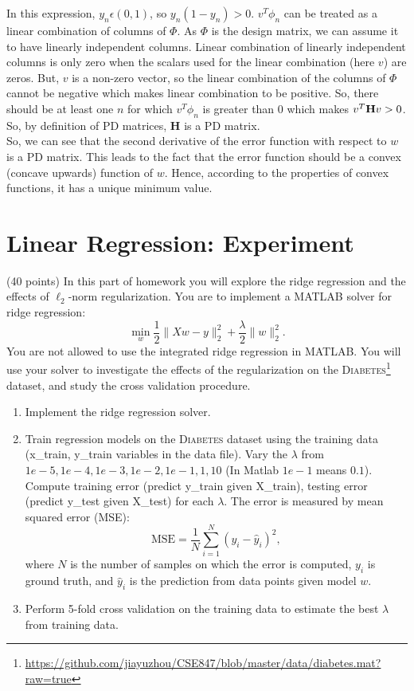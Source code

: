 \documentclass[11pt]{article}
\begin{document}
\begin{enumerate}
In this expression, $y_n \epsilon (0,1)$, so $y_n (1 - y_n) > 0$. $v^T \phi_n$ can be treated as a linear combination of columns of $\Phi$. As $\Phi$ is the design matrix, we can assume it to have linearly independent columns. Linear combination of linearly independent columns is only zero when the scalars used for the linear combination (here $v$) are zeros. But, $v$ is a non-zero vector, so the linear combination of the columns of $\Phi$ cannot be negative which makes linear combination to be positive. So, there should be at least one $n$ for which $v^T \phi_n$ is greater than $0$ which makes $v^T \bold{H} v > 0$. So, by definition of PD matrices, $\textbf{H}$ is a PD matrix.\\ 

So, we can see that the second derivative of the error function with respect to $w$ is a PD matrix. This leads to the fact that the error function should be a convex (concave upwards) function of $w$.  Hence, according to the properties of convex functions, it has a unique minimum value.
\end{enumerate}

\section{Linear Regression: Experiment} 

 (40 points) In this part of homework you will explore the ridge regression and the effects of
$\ell_2$-norm regularization. You are to implement a MATLAB solver for ridge regression:
$$ \min_w \frac{1}{2}\|Xw - y\|_2^2 + \frac{\lambda}{2} \|w\|_2^2. $$
You are not allowed to use the integrated ridge regression in MATLAB.
You will use your solver to investigate the effects of the regularization on the \textsc{Diabetes}\footnote{\url{https://github.com/jiayuzhou/CSE847/blob/master/data/diabetes.mat?raw=true}}
dataset, and study the cross validation procedure.

\begin{enumerate}
\item Implement the ridge regression solver.  
\item Train regression models on the \textsc{Diabetes} dataset using 
the training data (x\_train, y\_train variables in the data file). 
Vary the $\lambda$ from ${1e-5}, {1e-4}, {1e-3}, {1e-2}, {1e-1}, 1, 10$ (In 
Matlab $1e-1$ means $0.1$). 
Compute training error (predict y\_train given X\_train), testing error (predict y\_test given X\_test) for each $\lambda$. 
The error is measured by mean squared error (MSE):
$$
\mbox{MSE} = \frac{1}{N}\sum_{i=1}^N (y_i - \hat y_i)^2,
$$
where $N$ is the number of samples on which the error is computed, $y_i$ 
is ground truth, and $\hat y_i$ is the prediction from data points 
given model $w$. 
\item Perform 5-fold cross validation on the training data to estimate the best $\lambda$ from training data.
\end{enumerate}
\end{document}
